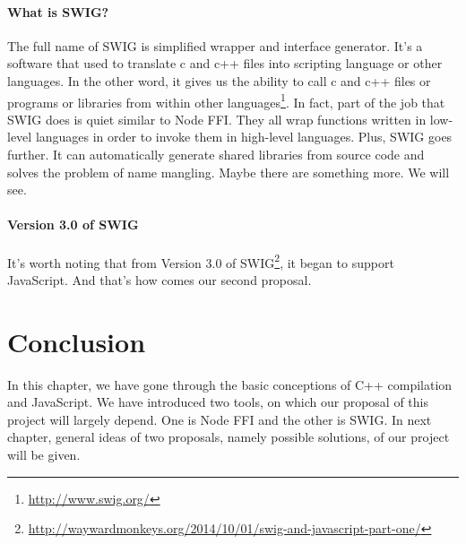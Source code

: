             \paragraph{What is SWIG?} The full name of SWIG is simplified wrapper and interface generator. It's a software that used to translate c and c++ files into scripting language or other languages. In the other word, it gives us the ability to call c and c++ files or programs or libraries from within other languages\footnote{\url{http://www.swig.org/}}.
            In fact, part of the job that SWIG does is quiet similar to Node FFI. They all wrap functions written in low-level languages in order to invoke them in high-level languages. Plus, SWIG goes further. It can automatically generate shared libraries from source code and solves the problem of name mangling. Maybe there are something more. We will see. 
            
            \paragraph{Version 3.0 of SWIG}
            It's worth noting that from Version 3.0 of SWIG\footnote{\url{http://waywardmonkeys.org/2014/10/01/swig-and-javascript-part-one/}}, it began to support JavaScript. And that's how comes our second proposal. 

  

\section{Conclusion}
In this chapter, we have gone through the basic conceptions of C++ compilation and JavaScript. We have introduced two tools, on which our proposal of this project will largely depend. One is Node FFI and the other is SWIG. In next chapter, general ideas of two proposals, namely possible solutions, of our project will be given.  
  


